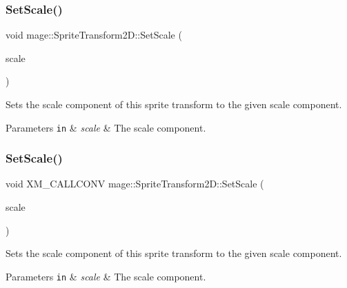 \subsubsection{\texorpdfstring{Set\+Scale()}{SetScale()}\hspace{0.1cm}{\footnotesize\ttfamily [3/4]}}
{\footnotesize\ttfamily void mage\+::\+Sprite\+Transform2\+D\+::\+Set\+Scale (\begin{DoxyParamCaption}\item[{\mbox{\hyperlink{namespacemage_aee4759dedc8def6c6dec26b5c7eddf29}{F32x2}}}]{scale }\end{DoxyParamCaption})\hspace{0.3cm}{\ttfamily [noexcept]}}

Sets the scale component of this sprite transform to the given scale component.


\begin{DoxyParams}[1]{Parameters}
\mbox{\tt in}  & {\em scale} & The scale component. \\
\hline
\end{DoxyParams}
\mbox{\label{classmage_1_1_sprite_transform2_d_a13cb4b836cc12f0528719c08d459e624}} 
\subsubsection{\texorpdfstring{Set\+Scale()}{SetScale()}\hspace{0.1cm}{\footnotesize\ttfamily [4/4]}}
{\footnotesize\ttfamily void X\+M\+\_\+\+C\+A\+L\+L\+C\+O\+NV mage\+::\+Sprite\+Transform2\+D\+::\+Set\+Scale (\begin{DoxyParamCaption}\item[{F\+X\+M\+V\+E\+C\+T\+OR}]{scale }\end{DoxyParamCaption})\hspace{0.3cm}{\ttfamily [noexcept]}}

Sets the scale component of this sprite transform to the given scale component.


\begin{DoxyParams}[1]{Parameters}
\mbox{\tt in}  & {\em scale} & The scale component. \\
\hline
\end{DoxyParams}
\mbox{\label{classmage_1_1_sprite_transform2_d_a3a80df8d3e45ff61cad6db60e5c87f7f}} 
